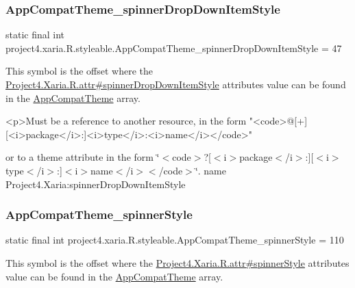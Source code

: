 \subsubsection{\texorpdfstring{App\+Compat\+Theme\+\_\+spinner\+Drop\+Down\+Item\+Style}{AppCompatTheme\_spinnerDropDownItemStyle}}
{\footnotesize\ttfamily static final int project4.\+xaria.\+R.\+styleable.\+App\+Compat\+Theme\+\_\+spinner\+Drop\+Down\+Item\+Style = 47\hspace{0.3cm}{\ttfamily [static]}}

This symbol is the offset where the \hyperlink{}{Project4.\+Xaria.\+R.\+attr\#spinner\+Drop\+Down\+Item\+Style} attribute\textquotesingle{}s value can be found in the \hyperlink{classproject4_1_1xaria_1_1R_1_1styleable_aad8bec413e2350f9404e6ff0e831a85d}{App\+Compat\+Theme} array.

\begin{DoxyVerb}      <p>Must be a reference to another resource, in the form "<code>@[+][<i>package</i>:]<i>type</i>:<i>name</i></code>"
\end{DoxyVerb}
 or to a theme attribute in the form \char`\"{}$<$code$>$?\mbox{[}$<$i$>$package$<$/i$>$\+:\mbox{]}\mbox{[}$<$i$>$type$<$/i$>$\+:\mbox{]}$<$i$>$name$<$/i$>$$<$/code$>$\char`\"{}.  name Project4.\+Xaria\+:spinner\+Drop\+Down\+Item\+Style \mbox{\label{classproject4_1_1xaria_1_1R_1_1styleable_a918d109191c529fed6f95201986203af}} 
\subsubsection{\texorpdfstring{App\+Compat\+Theme\+\_\+spinner\+Style}{AppCompatTheme\_spinnerStyle}}
{\footnotesize\ttfamily static final int project4.\+xaria.\+R.\+styleable.\+App\+Compat\+Theme\+\_\+spinner\+Style = 110\hspace{0.3cm}{\ttfamily [static]}}

This symbol is the offset where the \hyperlink{}{Project4.\+Xaria.\+R.\+attr\#spinner\+Style} attribute\textquotesingle{}s value can be found in the \hyperlink{classproject4_1_1xaria_1_1R_1_1styleable_aad8bec413e2350f9404e6ff0e831a85d}{App\+Compat\+Theme} array.

